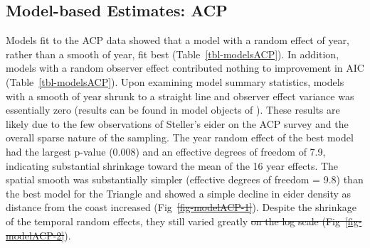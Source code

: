 \documentclass[
  10pt,
  letterpaper,
]{article}
\makeatletter
\providecommand{\DIFaddtex}[1]{{\protect\color{blue}\uwave{#1}}} %
\providecommand{\DIFdeltex}[1]{{\protect\color{red}\sout{#1}}} %
\providecommand{\DIFaddbegin}{} %
\providecommand{\DIFaddend}{} %
\providecommand{\DIFdelbegin}{} %
\providecommand{\DIFdelend}{} %
\providecommand{\DIFadd}[1]{\texorpdfstring{\DIFaddtex{#1}}{#1}} %
\providecommand{\DIFdel}[1]{\texorpdfstring{\DIFdeltex{#1}}{}} %
\providecommand{\DIFscaledelfig}{0.5}
\newlength{\DIFdelgraphicswidth} %
\newlength{\DIFdelgraphicsheight} %
\providecommand{\DIFaddincludegraphics}[2][]{{\color{blue}\fbox{\DIFOincludegraphics[#1]{#2}}}} %
\providecommand{\DIFdelincludegraphics}[2][]{%
\sbox{\DIFdelgraphicsbox}{\DIFOincludegraphics[#1]{#2}}%
\settoboxwidth{\DIFdelgraphicswidth}{\DIFdelgraphicsbox} %
\settoboxtotalheight{\DIFdelgraphicsheight}{\DIFdelgraphicsbox} %
\scalebox{\DIFscaledelfig}{%
\parbox[b]{\DIFdelgraphicswidth}{\usebox{\DIFdelgraphicsbox}\\[-\baselineskip] \rule{\DIFdelgraphicswidth}{0em}}\llap{\resizebox{\DIFdelgraphicswidth}{\DIFdelgraphicsheight}{%
\setlength{\unitlength}{\DIFdelgraphicswidth}%
\begin{picture}(1,1)%
\thicklines\linethickness{2pt} %
{\color[rgb]{1,0,0}\put(0,0){\framebox(1,1){}}}%
{\color[rgb]{1,0,0}\put(0,0){\line( 1,1){1}}}%
{\color[rgb]{1,0,0}\put(0,1){\line(1,-1){1}}}%
\end{picture}%
}\hspace*{3pt}}} %
} %
\DeclareRobustCommand{\DIFaddbegin}{\DIFOaddbegin \let\includegraphics\DIFaddincludegraphics} %
\DeclareRobustCommand{\DIFaddend}{\DIFOaddend \let\includegraphics\DIFOincludegraphics} %
\DeclareRobustCommand{\DIFdelbegin}{\DIFOdelbegin \let\includegraphics\DIFdelincludegraphics} %
\DeclareRobustCommand{\DIFdelend}{\DIFOaddend \let\includegraphics\DIFOincludegraphics} %
\let\sout@orig\sout %
\renewcommand{\sout}[1]{\ifmmode\text{\sout@orig{\ensuremath{#1}}}\else\sout@orig{#1}\fi} %
\makeatother
\begin{document}
\subsection{Model-based Estimates: ACP}\label{model-based-estimates-acp}

Models fit to the ACP data showed that a model with a random effect of
year, rather than a smooth of year, fit best
(Table~\ref{tbl-modelsACP}). In addition, models with a random observer
effect contributed nothing to improvement in AIC
(Table~\ref{tbl-modelsACP}). Upon examining model summary statistics,
models with a smooth of year shrunk to a straight line and observer
effect variance was essentially zero (results can be found in model
objects of ). These results are likely due to the
few observations of Steller's eider on the ACP survey and the overall
sparse nature of the sampling. The year random effect of the best model
had the largest p-value (0.008) and an effective degrees of freedom of
7.9, indicating substantial shrinkage toward the mean of the 16 year
effects. The spatial smooth was substantially simpler (effective degrees
of freedom = 9.8) than the best model for the Triangle and showed a
simple decline in eider density as distance from the coast increased
(Fig~\DIFdelbegin \DIFdel{\ref{fig-modelACP-1}}\DIFdelend \DIFaddbegin \DIFadd{\ref{fig-modelACP}}\DIFaddend ). Despite the shrinkage of the temporal random
effects, they still varied greatly \DIFdelbegin \DIFdel{on the log scale
(Fig~\ref{fig-modelACP-2}}\DIFdelend \DIFaddbegin \DIFadd{(see below}\DIFaddend ).
\end{document}
